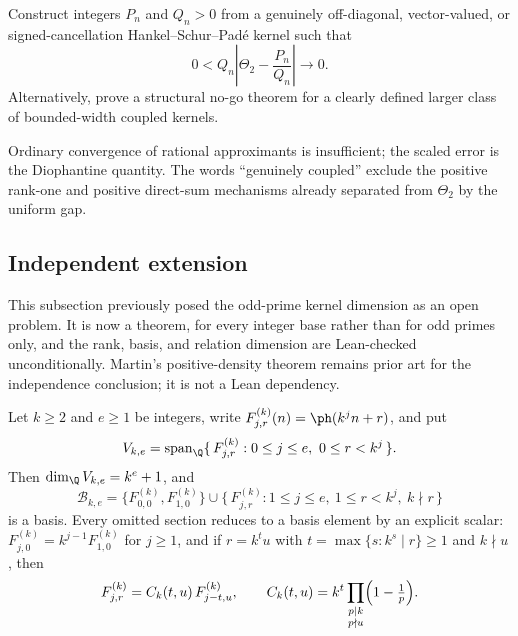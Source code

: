 \begin{problem}\label{prob:hankel}
Construct integers $P_n$ and $Q_n>0$ from a genuinely off-diagonal,
vector-valued, or signed-cancellation Hankel--Schur--Pad\'e kernel such that
\[
 0<Q_n\left|\Theta_2-\frac{P_n}{Q_n}\right|\longrightarrow0.
\]
Alternatively, prove a structural no-go theorem for a clearly defined larger
class of bounded-width coupled kernels.
\end{problem}

\noindent Ordinary convergence of rational approximants is insufficient; the
scaled error is the Diophantine quantity.  The words ``genuinely coupled''
exclude the positive rank-one and positive direct-sum mechanisms already
separated from $\Theta_2$ by the uniform gap.

\subsection{Independent extension}

This subsection previously posed the odd-prime kernel dimension as an open
problem.  It is now a theorem, for every integer base rather than for odd
primes only, and the rank, basis, and relation dimension are Lean-checked
unconditionally.  Martin's positive-density theorem remains prior art for the
independence conclusion; it is not a Lean dependency.

\begin{theorem}
\label{thm:kkernelrank}
Let $k\ge2$ and $e\ge1$ be integers, write $F^{(k)}_{j,r}(n)=\ph(k^jn+r)$, and put
\[
 V_{k,e}=\operatorname{span}_{\Q}
 \{\,F^{(k)}_{j,r}:0\le j\le e,\ 0\le r<k^j\,\}.
\]
Then $\dim_{\Q}V_{k,e}=k^e+1$, and
\[
 \mathcal B_{k,e}
 =\{F^{(k)}_{0,0},F^{(k)}_{1,0}\}
 \cup\{\,F^{(k)}_{j,r}:1\le j\le e,\ 1\le r<k^j,\ k\nmid r\,\}
\]
is a basis.  Every omitted section reduces to a basis element by an explicit
scalar: $F^{(k)}_{j,0}=k^{j-1}F^{(k)}_{1,0}$ for $j\ge1$, and if $r=k^tu$ with
$t=\max\{s:k^s\mid r\}\ge1$ and $k\nmid u$, then
\[
 F^{(k)}_{j,r}=C_k(t,u)\,F^{(k)}_{j-t,u},
 \qquad
 C_k(t,u)=k^t\prod_{\substack{p\mid k\\ p\nmid u}}\Bigl(1-\tfrac1p\Bigr).
\]
\end{theorem}

